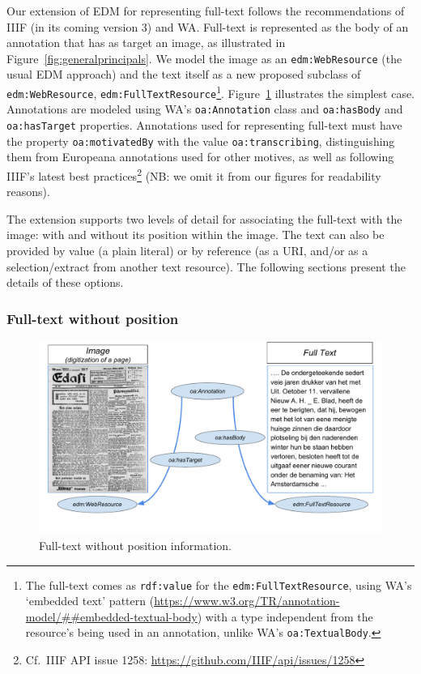 \documentclass[a4paper,UKenglish,cleveref, autoref]{oasics-v2019}
\begin{document}
Our extension of EDM for representing full-text follows the recommendations of IIIF (in its coming version 3) and WA. Full-text is represented as the body of an annotation that has as target an image, as illustrated in Figure~\ref{fig:generalprincipals}. We model the image as an \verb+edm:WebResource+ (the usual EDM approach) and the text itself as a new proposed subclass of \verb+edm:WebResource+, 
\verb+edm:FullTextResource+\footnote{The full-text comes as \verb+rdf:value+ for the \verb+edm:FullTextResource+, using WA’s `embedded text' pattern (\url{https://www.w3.org/TR/annotation-model/##embedded-textual-body}) with a type independent from the resource’s being used in an annotation, unlike WA’s \verb+oa:TextualBody+.}.
Figure~\ref{fig:nopositioninfo} illustrates the simplest case. Annotations are modeled using WA's \verb+oa:Annotation+ class and \verb+oa:hasBody+ and \verb+oa:hasTarget+ properties. Annotations used for representing full-text must have the property \verb+oa:motivatedBy+ with the value \verb+oa:transcribing+, distinguishing them from Europeana annotations used for other motives, as well as following IIIF's latest best practices\footnote{Cf.\, IIIF API issue 1258: \url{https://github.com/IIIF/api/issues/1258}}
(NB: we omit it from our figures for readability reasons).

The extension supports two levels of detail for associating the full-text with the image: with and without its position within the image. The text can also be provided by value (a plain literal) or by reference (as a URI, and/or as a selection/extract from another text resource). The following sections present the details of these options.

\subsubsection{Full-text without position}

\begin{figure}
    \centering
    \includegraphics{Fig2}
    \caption{Full-text without position information.}\label{fig:nopositioninfo}
\end{figure}
\end{document}

